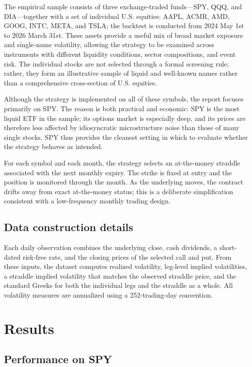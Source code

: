 ﻿\documentclass{article}
\begin{document}
The empirical sample consists of three exchange-traded funds---SPY, QQQ, and DIA---together with a set of individual U.S. equities: AAPL, ACMR, AMD, GOOG, INTC, META, and TSLA; the backtest is conducted from 2024 May 1st to 2026 March 31st. These assets provide a useful mix of broad market exposure and single-name volatility, allowing the strategy to be examined across instruments with different liquidity conditions, sector compositions, and event risk. The individual stocks are not selected through a formal screening rule; rather, they form an illustrative sample of liquid and well-known names rather than a comprehensive cross-section of U.S. equities.

Although the strategy is implemented on all of these symbols, the report focuses primarily on SPY. The reason is both practical and economic: SPY is the most liquid ETF in the sample; its options market is especially deep, and its prices are therefore less affected by idiosyncratic microstructure noise than those of many single stocks. SPY thus provides the cleanest setting in which to evaluate whether the strategy behaves as intended.

For each symbol and each month, the strategy selects an at-the-money straddle associated with the next monthly expiry. The strike is fixed at entry and the position is monitored through the month. As the underlying moves, the contract drifts away from exact at-the-money status; this is a deliberate simplification consistent with a low-frequency monthly trading design.

\subsection{Data construction details}

Each daily observation combines the underlying close, cash dividends, a short-dated risk-free rate, and the closing prices of the selected call and put. From these inputs, the dataset computes realized volatility, leg-level implied volatilities, a straddle implied volatility that matches the observed straddle price, and the standard Greeks for both the individual legs and the straddle as a whole. All volatility measures are annualized using a 252-trading-day convention.

\section{Results}
\label{sec:results}

\subsection{Performance on SPY}
\end{document}
